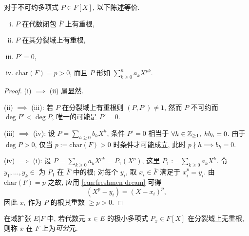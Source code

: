 \begin{theorem}\label{prop:separable-polynomial}
	对于不可约多项式 $P \in F[X]$, 以下陈述等价.
	\begin{enumerate}[(i)]
		\item $P$ 在代数闭包 $\overline{F}$ 上有重根,
		\item $P$ 在其分裂域上有重根,
		\item $P'=0$,
		\item $\mathrm{char}(F)=p > 0$, 而且 $P$ 形如 $\sum_{k \geq 0}^n a_k X^{pk}$.
	\end{enumerate}
\end{theorem}
\begin{proof}
	(i) $\implies$ (ii) 属显然.

	(ii) $\implies$ (iii): 若 $P$ 在分裂域上有重根则 $(P,P') \neq 1$, 然而 $P$ 不可约而 $\deg P' < \deg P$, 唯一的可能是 $P'=0$.
	
	(iii) $\implies$ (iv): 设 $P = \sum_{h \geq 0} b_h X^h$, 条件 $P'=0$ 相当于 $\forall h \in \mathbb{Z}_{\geq 1},\; h b_h = 0$. 由于 $\deg P > 0$, 仅当 $p := \text{char}(F) > 0$ 时条件才可能成立, 此时 $p \nmid h \implies b_h = 0$. %
	
	(iv) $\implies$ (i): 设 $P = \sum_{k \geq 0} a_k X^{pk} = P_1(X^p)$, 这里 $P_1 := \sum_{k \geq 0} a_k X^k$. 令 $y_1, \ldots, y_k \in $ 为 $P_1$ 在 $\overline{F}$ 中的根; 对每个 $y_i$, 取 $x_i \in \overline{F}$ 满足于 $x_i^p = y_i$. 由 $\text{char}(F)=p$ 之故, 应用 \eqref{eqn:freshmen-dream} 可得
	\[ (X^p-y_i) =  (X-x_i)^p, \]
	因此 $x_i$ 作为 $P$ 的根其重数 $\geq p > 0$.
\end{proof}

\begin{definition}[可分元]
	在域扩张 $E|F$ 中, 若代数元 $x \in E$ 的极小多项式 $P_x \in F[X]$ 在分裂域上无重根, 则称 $x$ 在 $F$ 上为\emph{可分}元.
\end{definition}

